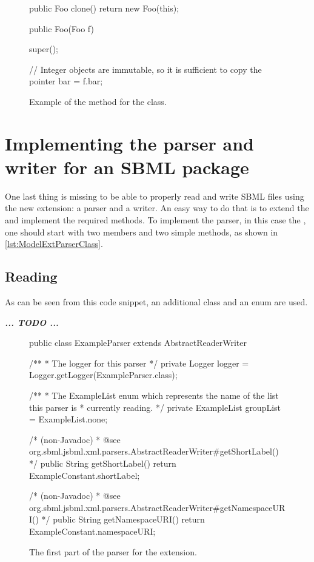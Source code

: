 \begin{figure}[htb]
  \begin{example}[numbers=left]
public Foo clone() {
  return new Foo(this);
}

public Foo(Foo f) {
  super();

  // Integer objects are immutable, so it is sufficient to copy the pointer
  bar = f.bar;
}\end{example}
  \caption{Example of the  method for the  class.}
  \label{lst:ModelExtCloneFoo}
\end{figure}


\section{Implementing the parser and writer for an SBML package}

One last thing is missing to be able to properly read and write SBML files
using the new extension: a parser and a writer. An easy way to do that is
to extend the \AbstractReaderWriter and implement the required methods. To
implement the parser, in this case the , one should
start with two members and two simple methods, as shown in
\vref{lst:ModelExtParserClass}.


\subsection{Reading}

As can be seen from this code snippet, an additional class
 and an enum  are used.

\emph{\textbf{... TODO ...}}

\begin{figure}[htb]
  \begin{example}[numbers=left]
public class ExampleParser extends AbstractReaderWriter {

  /**
   * The logger for this parser
   */
  private Logger logger = Logger.getLogger(ExampleParser.class);

  /**
   * The ExampleList enum which represents the name of the list this parser is
   * currently reading.
   */
  private ExampleList groupList = ExampleList.none;

  /* (non-Javadoc)
   * @see org.sbml.jsbml.xml.parsers.AbstractReaderWriter#getShortLabel()
   */
  public String getShortLabel() {
    return ExampleConstant.shortLabel;
  }

  /* (non-Javadoc)
   * @see org.sbml.jsbml.xml.parsers.AbstractReaderWriter#getNamespaceURI()
   */
  public String getNamespaceURI() {
    return ExampleConstant.namespaceURI;
  }

}\end{example}
 \caption{The first part of the parser for the extension.}
 \label{lst:ModelExtParserClass}
\end{figure}


